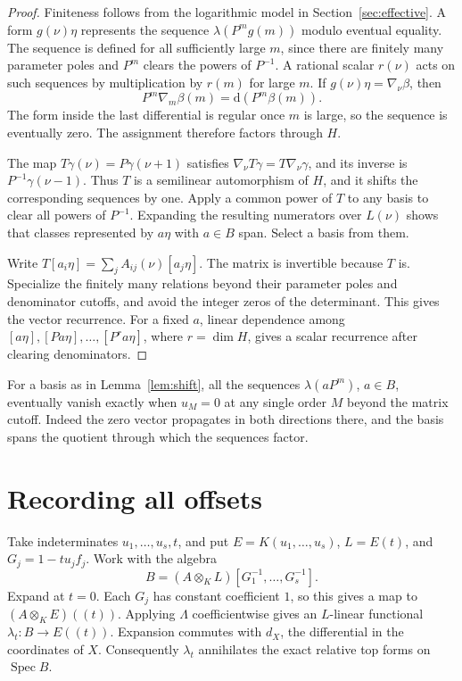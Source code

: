 \documentclass[11pt]{article}
\newcommand{\dd}{\mathrm d}
\begin{document}
\begin{proof}
Finiteness follows from the logarithmic model in
Section~\ref{sec:effective}. A form \(g(\nu)\eta\) represents the
sequence \(\lambda(P^m g(m))\) modulo eventual equality. The sequence
is defined for all sufficiently large \(m\), since there are finitely
many parameter poles and \(P^m\) clears the powers of \(P^{-1}\).
A rational scalar \(r(\nu)\) acts on such sequences by multiplication
by \(r(m)\) for large \(m\). If \(g(\nu)\eta=\nabla_\nu\beta\), then
\[
                P^m\nabla_m\beta(m)=\dd(P^m\beta(m)).
\]
The form inside the last differential is regular once \(m\) is large,
so the sequence is eventually zero. The assignment therefore factors
through \(H\).

The map \(T\gamma(\nu)=P\gamma(\nu+1)\) satisfies
\(\nabla_\nu T\gamma=T\nabla_\nu\gamma\), and its inverse is
\(P^{-1}\gamma(\nu-1)\). Thus \(T\) is a semilinear automorphism of
\(H\), and it shifts the corresponding sequences by one. Apply a
common power of \(T\) to any basis to clear all powers of \(P^{-1}\).
Expanding the resulting numerators over \(L(\nu)\) shows that classes
represented by \(a\eta\) with \(a\in B\) span. Select a basis from them.

Write \(T[a_i\eta]=\sum_j A_{ij}(\nu)[a_j\eta]\). The matrix is
invertible because \(T\) is. Specialize the finitely many relations
beyond their parameter poles and denominator cutoffs, and avoid the
integer zeros of the determinant. This gives the vector recurrence.
For a fixed \(a\), linear dependence among
\([a\eta],[Pa\eta],\ldots,[P^r a\eta]\), where \(r=\dim H\), gives
a scalar recurrence after clearing denominators.
\end{proof}

For a basis as in Lemma~\ref{lem:shift}, all the sequences
\(\lambda(aP^m)\), \(a\in B\), eventually vanish exactly when \(u_M=0\)
at any single order \(M\) beyond the matrix cutoff. Indeed the zero
vector propagates in both directions there, and the basis spans the
quotient through which the sequences factor.

\section{Recording all offsets}\label{sec:offsets}

Take indeterminates \(u_1,\ldots,u_s,t\), and put
\(E=K(u_1,\ldots,u_s)\), \(L=E(t)\), and \(G_j=1-tu_j f_j\).
Work with the algebra
\begin{equation}\label{eq:localization}
        B=(A\otimes_K L)[G_1^{-1},\ldots,G_s^{-1}].
\end{equation}
Expand at \(t=0\). Each \(G_j\) has constant coefficient \(1\),
so this gives a map to \((A\otimes_K E)((t))\). Applying \(\Lambda\)
coefficientwise gives an \(L\)-linear functional
\(\lambda_t:B\to E((t))\). Expansion commutes with \(d_X\), the
differential in the coordinates of \(X\). Consequently \(\lambda_t\)
annihilates the exact relative top forms on \(\operatorname{Spec} B\).
\end{document}
